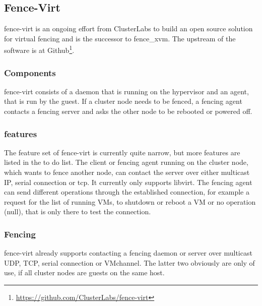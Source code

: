 


\subsection{Fence-Virt}
fence-virt is an ongoing effort from ClusterLabs to build an open source solution
for virtual fencing and is the successor to fence\_xvm. 
The upstream of the software is at Github\footnote{\url{https://github.com/ClusterLabs/fence-virt}}.

\subsubsection{Components}
fence-virt consists of a daemon that is running on the hypervisor and 
an agent, that is run by the guest. If a cluster node needs to be fenced,
a fencing agent contacts a fencing server and asks the other node to
be rebooted or powered off.

\subsubsection{features}
The feature set of fence-virt is currently quite narrow, but more features are listed
in the to do list.
The client or fencing agent running on the cluster node, which wants to fence
another node, can contact the server over either multicast IP, serial connection or
tcp. It currently only supports libvirt.
The fencing agent can send different operations through the established connection,
for example a request for the list of running \acp{VM}, to shutdown or reboot a \ac{VM}
or no operation (null), that is only there to test the connection.

\subsubsection{Fencing}
fence-virt already supports contacting a fencing daemon or server over
multicast UDP, TCP, serial connection or VMchannel. The latter two obviously are only
of use, if all cluster nodes are guests on the same host.

